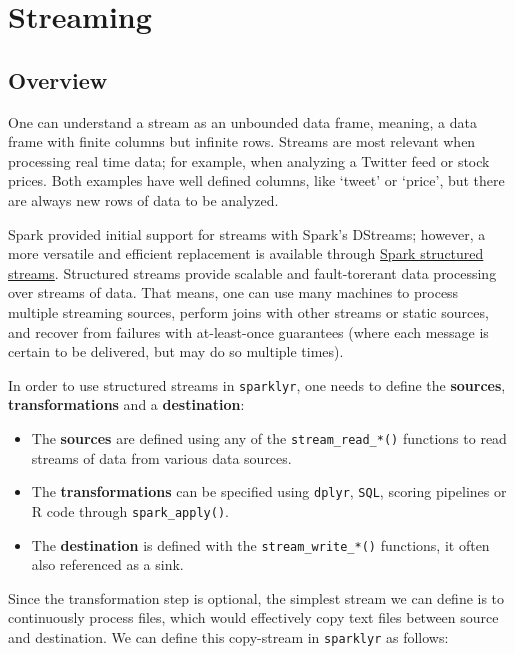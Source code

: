 \documentclass[]{book}
\providecommand{\tightlist}{%
  \setlength{\itemsep}{0pt}\setlength{\parskip}{0pt}}
\theoremstyle{definition}
\theoremstyle{definition}
\theoremstyle{definition}
\theoremstyle{remark}
\begin{document}
\hypertarget{streaming}{%
\chapter{Streaming}\label{streaming}}

\hypertarget{overview-4}{%
\section{Overview}\label{overview-4}}

One can understand a stream as an unbounded data frame, meaning, a data
frame with finite columns but infinite rows. Streams are most relevant
when processing real time data; for example, when analyzing a Twitter
feed or stock prices. Both examples have well defined columns, like
`tweet' or `price', but there are always new rows of data to be
analyzed.

Spark provided initial support for streams with Spark's DStreams;
however, a more versatile and efficient replacement is available through
\href{https://spark.apache.org/docs/latest/structured-streaming-programming-guide.html}{Spark
structured streams}. Structured streams provide scalable and
fault-torerant data processing over streams of data. That means, one can
use many machines to process multiple streaming sources, perform joins
with other streams or static sources, and recover from failures with
at-least-once guarantees (where each message is certain to be delivered,
but may do so multiple times).

In order to use structured streams in \texttt{sparklyr}, one needs to
define the \textbf{sources}, \textbf{transformations} and a
\textbf{destination}:

\begin{itemize}
\tightlist
\item
  The \textbf{sources} are defined using any of the
  \texttt{stream\_read\_*()} functions to read streams of data from
  various data sources.
\item
  The \textbf{transformations} can be specified using \texttt{dplyr},
  \texttt{SQL}, scoring pipelines or R code through
  \texttt{spark\_apply()}.
\item
  The \textbf{destination} is defined with the
  \texttt{stream\_write\_*()} functions, it often also referenced as a
  sink.
\end{itemize}

Since the transformation step is optional, the simplest stream we can
define is to continuously process files, which would effectively copy
text files between source and destination. We can define this
copy-stream in \texttt{sparklyr} as follows:
\end{document}
